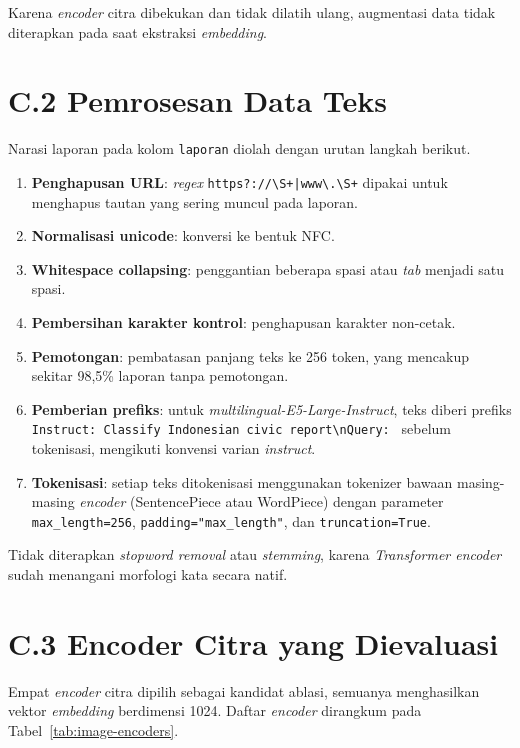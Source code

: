 Karena \textit{encoder} citra dibekukan dan tidak dilatih ulang, augmentasi data tidak diterapkan pada saat ekstraksi \textit{embedding}.

\section*{C.2 Pemrosesan Data Teks}
\label{app:txt-preprocess}

Narasi laporan pada kolom \texttt{laporan} diolah dengan urutan langkah berikut.

\begin{enumerate}
    \item \textbf{Penghapusan URL}: \textit{regex} \texttt{https?://\textbackslash S+|www\textbackslash .\textbackslash S+} dipakai untuk menghapus tautan yang sering muncul pada laporan.
    \item \textbf{Normalisasi unicode}: konversi ke bentuk NFC.
    \item \textbf{Whitespace collapsing}: penggantian beberapa spasi atau \textit{tab} menjadi satu spasi.
    \item \textbf{Pembersihan karakter kontrol}: penghapusan karakter non-cetak.
    \item \textbf{Pemotongan}: pembatasan panjang teks ke 256 token, yang mencakup sekitar 98,5\% laporan tanpa pemotongan.
    \item \textbf{Pemberian prefiks}: untuk \textit{multilingual-E5-Large-Instruct}, teks diberi prefiks \texttt{Instruct: Classify Indonesian civic report\textbackslash nQuery: } sebelum tokenisasi, mengikuti konvensi varian \textit{instruct}.
    \item \textbf{Tokenisasi}: setiap teks ditokenisasi menggunakan tokenizer bawaan masing-masing \textit{encoder} (SentencePiece atau WordPiece) dengan parameter \texttt{max\_length=256}, \texttt{padding="max\_length"}, dan \texttt{truncation=True}.
\end{enumerate}

Tidak diterapkan \textit{stopword removal} atau \textit{stemming}, karena \textit{Transformer encoder} sudah menangani morfologi kata secara natif.

\section*{C.3 Encoder Citra yang Dievaluasi}

Empat \textit{encoder} citra dipilih sebagai kandidat ablasi, semuanya menghasilkan vektor \textit{embedding} berdimensi 1024. Daftar \textit{encoder} dirangkum pada Tabel~\ref{tab:image-encoders}.

